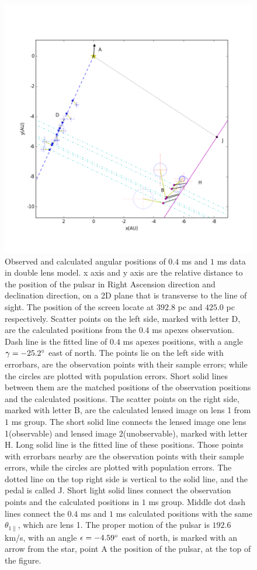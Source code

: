 \documentclass[useAMS,usenatbib]{mn2e}
\begin{document}
\begin{figure}
\centering
\includegraphics[width=1.0\textwidth, angle=0]{Double_lens_xy.png}
\caption{Observed and calculated angular positions of $0.4$ ms and $1$ ms data in double lens model. x axis and y axis are the relative distance to the position of the pulsar in Right Ascension direction and declination direction, on a 2D plane that is transverse to the line of sight. The position of the screen locate at $392.8$ pc and $425.0$ pc respectively. Scatter points on the left side, marked with letter D, are the calculated positions from the $0.4$ ms apexes observation. Dash line is the fitted line of $0.4$ ms apexes positions, with a angle $\gamma=-25.2\degree$  east of north. The points lie on the left side with errorbars, are the observation points with their sample errors; while the circles are plotted with population errors. Short solid lines between them are the matched positions of the observation positions and the calculated positions. The scatter points on the right side, marked with letter B, are the calculated lensed image on lens 1 from $1$ ms group. The short solid line connects the lensed image one lens 1(observable) and lensed image 2(unobservable), marked with letter H. Long solid line is the fitted line of these positions. Those points with errorbars nearby are the observation points with their sample errors, while the circles are plotted with population errors. The dotted line on the top right side is vertical to the solid line, and the pedal is called J. Short light solid lines connect the observation points and the calculated positions in $1$ ms group. Middle dot dash lines connect the $0.4$ ms and $1$ ms calculated positions with the same $\theta_{1\parallel}$, which are lens 1. The proper motion of the pulsar is $192.6$ km/s, with an angle $\epsilon=-4.59\degree$ east of north, is marked with an arrow from the star, point A the position of the pulsar, at the top of the figure.}
\label{Doublelens}
\end{figure}
\end{document}

